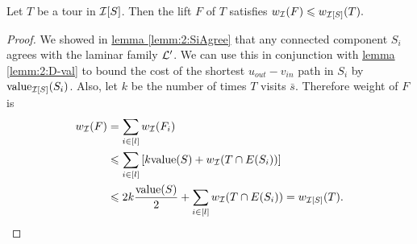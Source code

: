\documentclass[./main.tex]{subfiles}
\begin{document}
	\begin{lemma}\label{lemm:3:lift-i}
		Let $T$ be a tour in $\mathcal{I}[S]$. Then the lift $F$ of $T$ satisfies $w_{\mathcal{I}}(F) \leqslant w_{\mathcal{I}[S]}(T).$
	\end{lemma}
	\begin{proof}
		We showed in \hyperref[lemm:2:SiAgree]{lemma \ref{lemm:2:SiAgree}} that any connected component $S_i$ agrees with the laminar family $\mathcal{L}'$. We can use this in conjunction with \hyperref[lemm:2:D-val]{lemma \ref{lemm:2:D-val}} to bound the cost of the shortest $u_{out} - v_{in}$ path in $S_i$ by $\textup{value}_{\mathcal{I}[S]}(S_i)$. Also, let $k$ be the number of times $T$ visits $\bar{s}$. Therefore weight of $F$ is
		\begin{align*}
			w_{\mathcal{I}}(F) &= \sum_{i \in [l]} w_{\mathcal{I}}(F_i)\\
			&\leqslant \sum_{i \in [l]} \left[k\textup{value}(S) + w_{\mathcal{I}}(T \cap E(S_i))\right]\\
			&\leqslant 2k \frac{\textup{value}(S)}{2} + \sum_{i \in [l]}w_{\mathcal{I}}(T \cap E(S_i)) = w_{\mathcal{I}[S]}(T).
		\end{align*}
	\end{proof}
\end{document}

